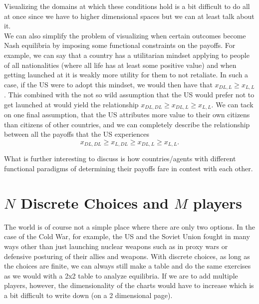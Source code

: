\documentclass[11pt,english]{article}
\begin{document}
\noindent Visualizing the domains at which these conditions hold is a bit difficult to do all at once since we have to higher dimensional spaces but we can at least talk about it.\\


\noindent We can also simplify the problem of visualizing when certain outcomes become Nash equilibria by imposing some functional constraints on the payoffs. For example, we can say that a country has a utilitarian mindset applying to people of all nationalities (where all life has at least some positive value) and when getting launched at it is weakly more utility for them to not retaliate. In such a case, if the US were to adopt this mindset, we would then have that $x_{DL,L} \geq x_{L,L}$. This combined with the not so wild assumption that the US would prefer not to get launched at would yield the relationship $x_{DL,DL} \geq x_{DL,L} \geq x_{L,L}$. We can tack on one final assumption, that the US attributes more value to their own citizens than citizens of other countries, and we can completely describe the relationship between all the payoffs that the US experiences $$x_{DL,DL} \geq x_{L,DL} \geq x_{DL,L} \geq x_{L,L}.$$

\noindent What is further interesting to discuss is how countries/agents with different functional paradigms of determining their payoffs fare in contest with each other.

\section*{$N$ Discrete Choices and $M$ players}
The world is of course not a simple place where there are only two options. In the case of the Cold War, for example, the US and the Soviet Union fought in many ways other than just launching nuclear weapons such as in proxy wars or defensive posturing of their allies and weapons. With discrete choices, as long as the choices are finite, we can always still make a table and do the same exercises as we would with a 2x2 table to analyze equilibria. If we are to add multiple players, however, the dimensionality of the charts would have to increase which is a bit difficult to write down (on a 2 dimensional page). \\
\end{document}
